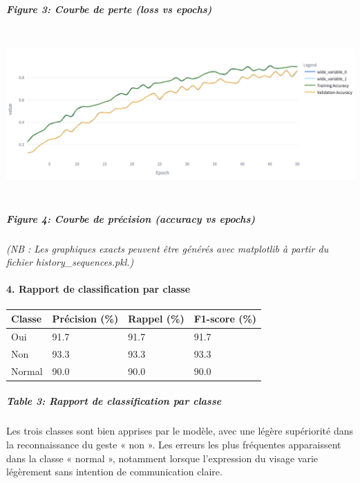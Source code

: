 \documentclass[
]{article}
\begin{document}
\hypertarget{figure-3-courbe-de-perte-loss-vs-epochs}{%
\subparagraph{Figure 3: Courbe de perte (loss vs epochs)}\label{figure-3-courbe-de-perte-loss-vs-epochs}}

\includegraphics[width=6.5in,height=2.45833in]{229856a5-a882-4d96-8360-24911cd95538_media/media/image2.png}

\hypertarget{figure-4-courbe-de-pruxe9cision-accuracy-vs-epochs}{%
\subparagraph{Figure 4: Courbe de précision (accuracy vs epochs)}\label{figure-4-courbe-de-pruxe9cision-accuracy-vs-epochs}}

\emph{(NB : Les graphiques exacts peuvent être générés avec matplotlib à partir du fichier history\_sequences.pkl.)}

\hypertarget{rapport-de-classification-par-classe}{%
\paragraph{\texorpdfstring{\textbf{4. Rapport de classification par classe}}{4. Rapport de classification par classe}}\label{rapport-de-classification-par-classe}}

\begin{longtable}[]{@{}llll@{}}
\toprule
\textbf{Classe} & \textbf{Précision (\%)} & \textbf{Rappel (\%)} & \textbf{F1-score (\%)} \\
\midrule
\endhead
Oui & 91.7 & 91.7 & 91.7 \\
Non & 93.3 & 93.3 & 93.3 \\
Normal & 90.0 & 90.0 & 90.0 \\
\bottomrule
\end{longtable}

\hypertarget{table-3-rapport-de-classification-par-classe}{%
\subparagraph{Table 3: Rapport de classification par classe}\label{table-3-rapport-de-classification-par-classe}}

Les trois classes sont bien apprises par le modèle, avec une légère supériorité dans la reconnaissance du geste « non ». Les erreurs les plus fréquentes apparaissent dans la classe « normal », notamment lorsque l'expression du visage varie légèrement sans intention de communication claire.
\end{document}
